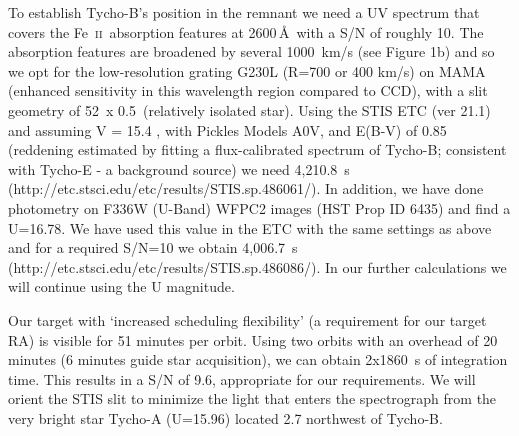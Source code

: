 \documentclass[12pt]{article}
\newcommand{\feii}{Fe~\textsc{ii}}
\begin{document}
To establish Tycho-B's position in the remnant we need a UV spectrum that covers the \feii\ absorption features at 2600\,\AA\ with a S/N of roughly 10. The absorption features are broadened by several 1000~km/s (see Figure 1b) and so we opt for the low-resolution grating G230L (R=700 or 400 km/s) on MAMA (enhanced sensitivity in this wavelength region compared to CCD), with a slit geometry of 52\arcsec\ x 0.5\arcsec\ (relatively isolated star). Using the STIS ETC (ver 21.1) and assuming V = 15.4 \citep{2004Natur.431.1069R}, with Pickles Models A0V, and E(B-V) of 0.85 (reddening estimated by fitting a flux-calibrated spectrum of Tycho-B; consistent with Tycho-E - a background source) we need  4,210.8~s (http://etc.stsci.edu/etc/results/STIS.sp.486061/). 
In addition, we have done photometry on F336W (U-Band) WFPC2 images (HST Prop ID 6435) and find a U=16.78. We have used this value in the ETC with the same settings as above and for a required S/N=10 we obtain 4,006.7~s (http://etc.stsci.edu/etc/results/STIS.sp.486086/). In our further calculations we will continue using the U magnitude.


Our target with `increased scheduling flexibility' (a requirement for our target RA) is visible for 51 minutes per orbit. Using two orbits with an overhead of 20 minutes (6 minutes guide star acquisition), we can obtain 2x1860~s of integration time. This results in a S/N of  9.6, appropriate for our requirements. We will orient the STIS slit to minimize the light that enters the spectrograph from the very bright star Tycho-A (U=15.96) located 2.7 \arcsec northwest of Tycho-B.



%
%
\specialreq             %


%
%
\coordinatedobs          %


%
%
\duplications           %
\end{document}
